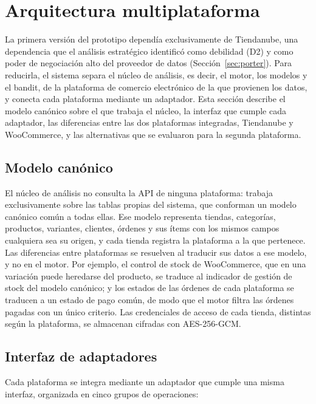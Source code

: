 \section{Arquitectura multiplataforma}
\label{sec:multiplataforma}

La primera versión del prototipo dependía exclusivamente de Tiendanube, una dependencia que el análisis estratégico identificó como debilidad (D2) y como poder de negociación alto del proveedor de datos (Sección~\ref{sec:porter}). Para reducirla, el sistema separa el núcleo de análisis, es decir, el motor, los modelos y el bandit, de la plataforma de comercio electrónico de la que provienen los datos, y conecta cada plataforma mediante un adaptador. Esta sección describe el modelo canónico sobre el que trabaja el núcleo, la interfaz que cumple cada adaptador, las diferencias entre las dos plataformas integradas, Tiendanube y WooCommerce, y las alternativas que se evaluaron para la segunda plataforma.

\subsection{Modelo canónico}
\label{sec:multiplataforma-canonico}

El núcleo de análisis no consulta la API de ninguna plataforma: trabaja exclusivamente sobre las tablas propias del sistema, que conforman un modelo canónico común a todas ellas. Ese modelo representa tiendas, categorías, productos, variantes, clientes, órdenes y sus ítems con los mismos campos cualquiera sea su origen, y cada tienda registra la plataforma a la que pertenece. Las diferencias entre plataformas se resuelven al traducir sus datos a ese modelo, y no en el motor. Por ejemplo, el control de stock de WooCommerce, que en una variación puede heredarse del producto, se traduce al indicador de gestión de stock del modelo canónico; y los estados de las órdenes de cada plataforma se traducen a un estado de pago común, de modo que el motor filtra las órdenes pagadas con un único criterio. Las credenciales de acceso de cada tienda, distintas según la plataforma, se almacenan cifradas con AES-256-GCM.

\subsection{Interfaz de adaptadores}
\label{sec:multiplataforma-adaptadores}

Cada plataforma se integra mediante un adaptador que cumple una misma interfaz, organizada en cinco grupos de operaciones:


